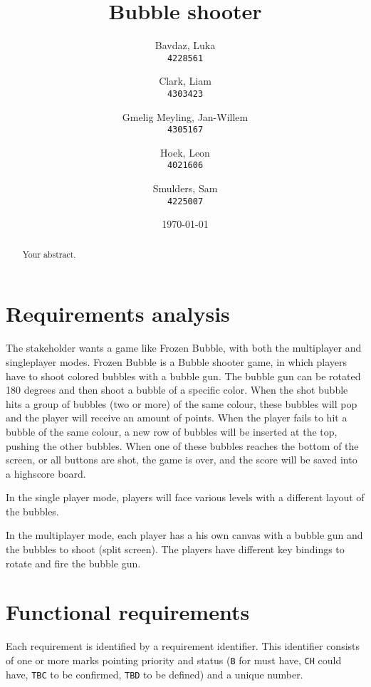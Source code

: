 \documentclass[a4paper]{article}
\title{Bubble shooter}
\author{
    Bavdaz, Luka\\
    \texttt{4228561}
    \and
    Clark, Liam\\
    \texttt{4303423}
    \and
    Gmelig Meyling, Jan-Willem\\
    \texttt{4305167}
    \and
    Hoek, Leon\\
    \texttt{4021606}
    \and
    Smulders, Sam\\
    \texttt{4225007}
}
\date{\today}
\begin{document}
\maketitle

\begin{abstract}
Your abstract.
\end{abstract}


\section{Requirements analysis}
The stakeholder wants a game like Frozen Bubble, with both the multiplayer and singleplayer modes. Frozen Bubble is a Bubble shooter game, in which players have to shoot colored bubbles with a bubble gun. The bubble gun can be rotated 180 degrees and then shoot a bubble of a specific color. When the shot bubble hits a group of bubbles (two or more) of the same colour, these bubbles will pop and the player will receive an amount of points. When the player fails to hit a bubble of the same colour, a new row of bubbles will be inserted at the top, pushing the other bubbles. When one of these bubbles reaches the bottom of the screen, or all buttons are shot, the game is over, and the score will be saved into a highscore board.
\par In the single player mode, players will face various levels with a different layout of the bubbles.
\par In the multiplayer mode, each player has a his own canvas with a bubble gun and the bubbles to shoot (split screen). The players have different key bindings to rotate and fire the bubble gun.

\section{Functional requirements}
Each requirement is identified by a requirement identifier. This identifier consists of one or more marks pointing priority and status (\texttt{B} for must have, \texttt{CH} could have, \texttt{TBC} to be confirmed, \texttt{TBD} to be defined) and a unique number.
\end{document}
